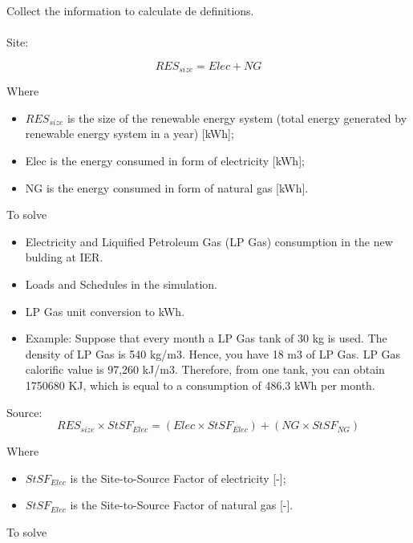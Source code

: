 \begin{enumerate*}
\item Collect the information to calculate de definitions.
\\\\
Site:

\begin{equation}
RES_{size} = Elec + NG
\end{equation}

Where
\begin{itemize}
\item $RES_{size}$ is the size of the renewable energy system (total energy generated by renewable energy system in a year) [kWh];
\item Elec is the energy consumed in form of electricity [kWh];
\item NG is the energy consumed in form of natural gas [kWh].
\end{itemize}


To solve                
    
\begin{itemize}
\item Electricity and Liquified Petroleum Gas (LP Gas) consumption in the new bulding at IER.
\item Loads and Schedules in the simulation.
\item LP Gas unit conversion to kWh. 

\item Example: Suppose that every month a LP Gas tank of 30 kg is used. The density of LP Gas is 540 kg/m3. Hence, you have 18 m3 of LP Gas. LP Gas calorific value is 97,260 kJ/m3. Therefore, from one tank, you can obtain 1750680 KJ, which is equal to a consumption of 486.3 kWh per month.
\end{itemize}

Source:
\begin{equation}
RES_{size} \times StSF_{Elec} = (Elec \times StSF_{Elec}) + (NG \times StSF_{NG}) 
\end{equation}

Where
\begin{itemize}
\item $StSF_{Elec}$ is the Site-to-Source Factor of electricity [-];
\item $StSF_{Elec}$ is the Site-to-Source Factor of natural gas [-].                                    
\end{itemize}


To solve
\begin{itemize}


\end{itemize}
\end{enumerate*}
